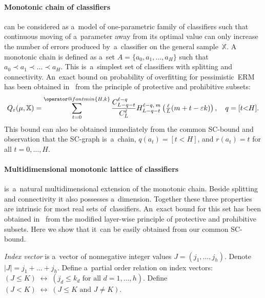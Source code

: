 \documentclass{article}
\makeatletter
\let\cite\citep
\def\XX{\mathbb{X}}
\renewcommand{\leq}{\leqslant}
\renewcommand{\min}{\mathop{\operator@font min}\limits}
\newcommand{\hypergeom}[5]{{#1}_{#2}^{#4,\:#3}\left(#5\right)}
\newcommand{\Hyper}[4]{\hypergeom{H}{#1}{#2}{#3}{#4}}
\renewcommand{\emph}[1]{\textit{#1}}
\makeatother
\begin{document}
\paragraph{Monotonic chain of classifiers}%
can be considered as a~model of one-parametric family of classifiers such that
continuous moving of a~parameter away from its optimal value
can only increase the number of errors produced by~a~classifier on the general sample~$\XX$.
A monotonic chain is defined as a~set $A=\{a_0,a_1,\ldots,a_H\}$ such that
$a_0 \prec a_1 \prec \dots \prec a_H$.
This is~a~simplest set of classifiers with splitting and connectivity.
An~exact bound on probability of overfitting for pessimistic~ERM
has been obtained in~\cite{voron10pria-eng}
from the principle of protective and prohibitive subsets:
\[
    Q_\eps(\mu,\XX)
    =
    \sum_{t=0}^{\min\{H,k\}}
        \frac{C_{L-q-t}^{\ell-q}}{C_{L}^{\ell}}
        \Hyper{L-q-t}{m}{\ell-q}{\tfrac\ell L (m+t - \eps k)},
    \quad
    q=[t{<}H].
\]
This bound can also be obtained immediately from the common SC-bound and observation that
the SC-graph is~a~chain, $q(a_t)=[t{<}H]$, and $r(a_t)=t$ for all $t=0,\ldots,H$.

\paragraph{Multidimensional monotonic lattice of classifiers}%
is~a~natural multidimensional extension of the monotonic chain.
Beside splitting and connectivity it also possesses a~dimension.
Together these three properties are intrinsic for most real sets of~classifiers.
An~exact bound for this set has been obtained in~\cite{botov11pria}
from the modified layer-wise principle of protective and prohibitive subsets.
Here we show that it~can be easily obtained from our common SC-bound.

\emph{Index vector} is a~vector of nonnegative integer values $J=(j_1,\ldots,j_h)$.
Denote $|J| = j_1+\dots+j_h$.
Define a~partial order relation on index vectors:
$(J\leq K) \;\leftrightarrow\; (j_d \leq k_d \text{ for all } d=1,\ldots,h)$.
Define
$(J<K) \;\leftrightarrow\; (J\leq K \text{ and } J\neq K)$.
\end{document}
